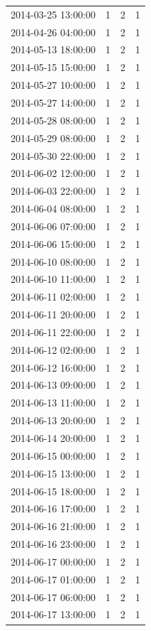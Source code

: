 \begin{tabular}{lrrr}
2014-03-25 13:00:00 & 1 & 2 & 1 \\
2014-04-26 04:00:00 & 1 & 2 & 1 \\
2014-05-13 18:00:00 & 1 & 2 & 1 \\
2014-05-15 15:00:00 & 1 & 2 & 1 \\
2014-05-27 10:00:00 & 1 & 2 & 1 \\
2014-05-27 14:00:00 & 1 & 2 & 1 \\
2014-05-28 08:00:00 & 1 & 2 & 1 \\
2014-05-29 08:00:00 & 1 & 2 & 1 \\
2014-05-30 22:00:00 & 1 & 2 & 1 \\
2014-06-02 12:00:00 & 1 & 2 & 1 \\
2014-06-03 22:00:00 & 1 & 2 & 1 \\
2014-06-04 08:00:00 & 1 & 2 & 1 \\
2014-06-06 07:00:00 & 1 & 2 & 1 \\
2014-06-06 15:00:00 & 1 & 2 & 1 \\
2014-06-10 08:00:00 & 1 & 2 & 1 \\
2014-06-10 11:00:00 & 1 & 2 & 1 \\
2014-06-11 02:00:00 & 1 & 2 & 1 \\
2014-06-11 20:00:00 & 1 & 2 & 1 \\
2014-06-11 22:00:00 & 1 & 2 & 1 \\
2014-06-12 02:00:00 & 1 & 2 & 1 \\
2014-06-12 16:00:00 & 1 & 2 & 1 \\
2014-06-13 09:00:00 & 1 & 2 & 1 \\
2014-06-13 11:00:00 & 1 & 2 & 1 \\
2014-06-13 20:00:00 & 1 & 2 & 1 \\
2014-06-14 20:00:00 & 1 & 2 & 1 \\
2014-06-15 00:00:00 & 1 & 2 & 1 \\
2014-06-15 13:00:00 & 1 & 2 & 1 \\
2014-06-15 18:00:00 & 1 & 2 & 1 \\
2014-06-16 17:00:00 & 1 & 2 & 1 \\
2014-06-16 21:00:00 & 1 & 2 & 1 \\
2014-06-16 23:00:00 & 1 & 2 & 1 \\
2014-06-17 00:00:00 & 1 & 2 & 1 \\
2014-06-17 01:00:00 & 1 & 2 & 1 \\
2014-06-17 06:00:00 & 1 & 2 & 1 \\
2014-06-17 13:00:00 & 1 & 2 & 1 \\

\end{tabular}
